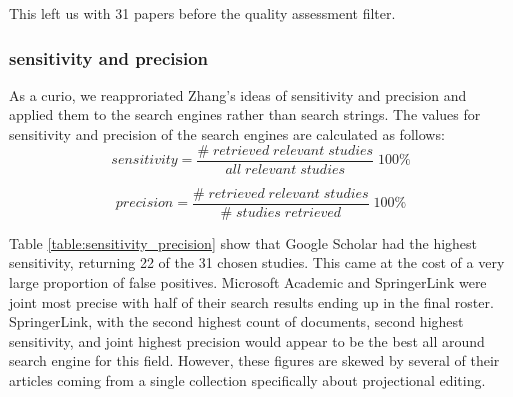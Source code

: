 This left us with 31 papers before the quality assessment filter. 

\subsubsection{sensitivity and precision}
As a curio, we reapproriated Zhang's\cite{Zhang_2011} ideas of sensitivity and precision and applied them to the search engines rather than search strings.
The values for sensitivity and precision of the search engines are calculated as follows:
\[
        sensitivity = \frac{\#\;retrieved\;relevant\;studies}{all\;relevant\;studies} \;100\%
\]

\[
        precision = \frac{\#\;retrieved\;relevant\;studies}{\#\;studies\;retrieved} \;100\%
\]

Table \ref{table:sensitivity_precision} show that Google Scholar had the highest sensitivity, returning 22 of the 31 chosen studies.
This came at the cost of a very large proportion of false positives.
Microsoft Academic and SpringerLink were joint most precise with half of their search results ending up in the final roster.
SpringerLink, with the second highest count of documents, second highest sensitivity, and joint highest precision would appear to be the best all around search engine for this field.
However, these figures are skewed by several of their articles coming from a single collection specifically about projectional editing.

